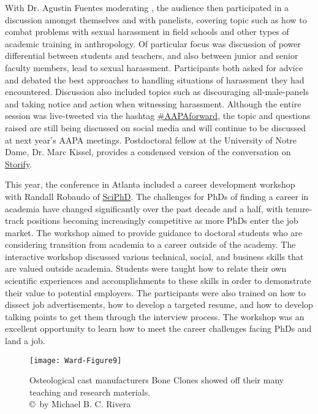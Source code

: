 \documentclass[english]{ijsra}
\def\authortwo{Michael B. C. Rivera}
\begin{document}
With Dr. Agustin Fuentes moderating , the audience then participated in a discussion amongst themselves and with panelists,
covering topic such as how to combat problems with sexual harassment in field schools and 
other types of academic training in anthropology. 
Of particular focus was discussion of power differential between students and teachers,
and also between junior and senior faculty members, lead to sexual harassment. 
Participants both asked for advice and debated the best approaches to handling situations of harassment they had encountered.
Discussion also included topics such as discouraging all-male-panels and taking notice and action when witnessing harassment.
Although the entire session was live-tweeted via the hashtag \href{https://twitter.com/search?q=\%23AAPAforward\&src=typd}{\#AAPAforward},
the topic and questions raised are still being discussed on social media and will continue to
be discussed at next year’s AAPA meetings. 
Postdoctoral fellow at the University of Notre Dame, Dr. Marc Kissel, provides a condensed version of the conversation on \href{http://storify.com/MarcKissel/getting-started}{Storify}.

This year, the conference in Atlanta included a career development workshop with Randall Robaudo of \href{http://sciphd.com/}{SciPhD}.
The challenges for PhDs of finding a career in academia have changed significantly over the past decade and a half,
with tenure-track positions becoming increasingly competitive as more PhDs enter the job market. 
The workshop aimed to provide guidance to doctoral students who are considering transition from academia to
a career outside of the academy. 
The interactive workshop discussed various technical, social, and business skills that are valued outside academia.
Students were taught how to relate their own scientific experiences and accomplishments to these skills in order to
demonstrate their value to potential employers. 
The participants were also trained on how to dissect job advertisements, how to develop a targeted resume,
and how to develop talking points to get them through the interview process. 
The workshop was an excellent opportunity to learn how to meet the career challenges facing PhDs and land a job.

	\begin{figure}[!tb] %
		\centering
		\texttt{[image: Ward-Figure9]}
		\caption{Osteological cast manufacturers Bone Clones showed off their many teaching and research materials.
				{\normalfont\scriptsize \\ \copyright\ by \authortwo}}
		\label{fig:Ward-Figure9}
	\end{figure}
	
\end{document}
